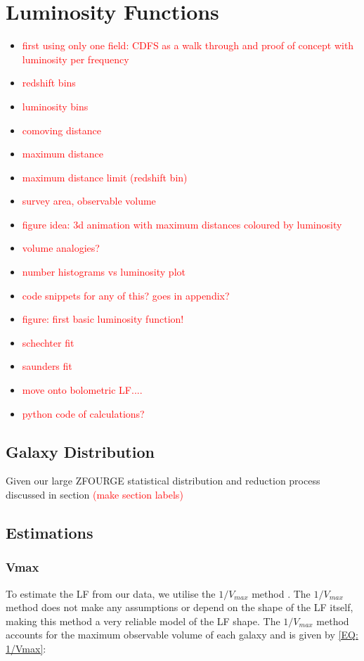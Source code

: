 \chapter{Luminosity Functions}
\thispagestyle{empty}

\begin{itemize}
    \item \textcolor{red}{first using only one field: CDFS as a walk through and proof of concept with luminosity per frequency}
    \item \textcolor{red}{redshift bins}
    \item \textcolor{red}{luminosity bins}
    \item \textcolor{red}{comoving distance}
    \item \textcolor{red}{maximum distance}
    \item \textcolor{red}{maximum distance limit (redshift bin)}
    \item \textcolor{red}{survey area, observable volume}
    \item \textcolor{red}{figure idea: 3d animation with maximum distances coloured by luminosity}
    \item \textcolor{red}{volume analogies?}
    \item \textcolor{red}{number histograms vs luminosity plot}
    \item \textcolor{red}{code snippets for any of this? goes in appendix?}
    \item \textcolor{red}{figure: first basic luminosity function!}
    \item \textcolor{red}{schechter fit}
    \item \textcolor{red}{saunders fit}
    \item \textcolor{red}{move onto bolometric LF....}
    \item \textcolor{red}{python code of calculations?}
\end{itemize}

\section{Galaxy Distribution}
Given our large ZFOURGE statistical distribution and reduction process discussed in section \textcolor{red}{(make section labels)}

\section{Estimations}
\subsection{Vmax}
To estimate the LF from our data, we utilise the $1/V_{max}$ method \citep{schmidt_space_1968}. The $1/V_{max}$ method does not make any assumptions or depend on the shape of the LF itself, making this method a very reliable model of the LF shape. The $1/V_{max}$ method accounts for the maximum observable volume of each galaxy and is given by \cref{EQ: 1/Vmax}:


